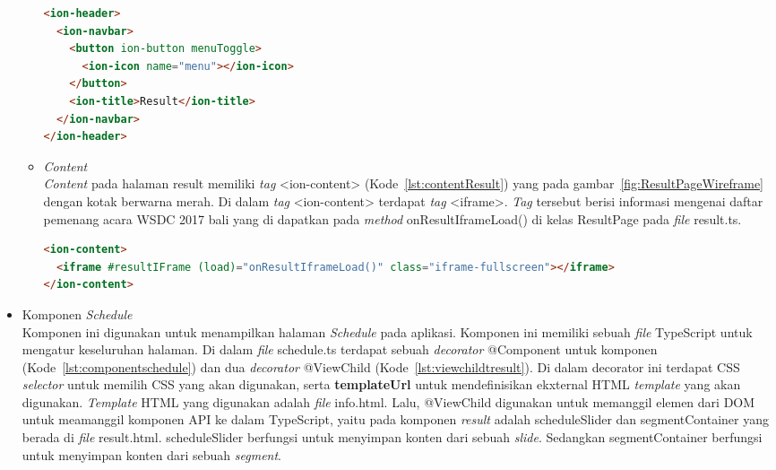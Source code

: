 \begin{itemize}
\begin{itemize}
\begin{lstlisting}[language=html, label={lst:headerResult}, caption=\textit{Header} pada result.html]
<ion-header>
  <ion-navbar>
    <button ion-button menuToggle>
      <ion-icon name="menu"></ion-icon>
    </button>
    <ion-title>Result</ion-title>
  </ion-navbar>
</ion-header>
\end{lstlisting}

		\item \textit{Content}\\
		\textit{Content} pada halaman result memiliki \textit{tag} <ion-content> (Kode~\ref{lst:contentResult}) yang pada gambar~\ref{fig:ResultPageWireframe} dengan kotak berwarna merah. Di dalam \textit{tag} <ion-content> terdapat \textit{tag} <iframe>. \textit{Tag} tersebut berisi informasi mengenai daftar pemenang acara WSDC 2017 bali yang di dapatkan pada \textit{method} onResultIframeLoad() di kelas ResultPage pada \textit{file} result.ts.
		
\begin{lstlisting}[language=html, label={lst:contentResult}, caption=\textit{Content} pada result.html]
<ion-content>
  <iframe #resultIFrame (load)="onResultIframeLoad()" class="iframe-fullscreen"></iframe>
</ion-content>
\end{lstlisting} 
	\end{itemize}
	
	\item Komponen \textit{Schedule}\\ 
	Komponen ini digunakan untuk menampilkan halaman \textit{Schedule} pada aplikasi. Komponen ini memiliki sebuah \textit{file} TypeScript untuk mengatur keseluruhan halaman. Di dalam \textit{file} schedule.ts terdapat sebuah \textit{decorator} @Component untuk komponen (Kode~\ref{lst:componentschedule}) dan dua \textit{decorator} @ViewChild (Kode~\ref{lst:viewchildtresult}). Di dalam decorator ini terdapat CSS \textit{selector} untuk memilih CSS yang akan digunakan, serta \textbf{templateUrl} untuk mendefinisikan ekxternal HTML \textit{template} yang akan digunakan. \textit{Template} HTML yang digunakan adalah \textit{file} info.html. Lalu, @ViewChild digunakan untuk memanggil elemen dari DOM untuk meamanggil komponen API ke dalam TypeScript, yaitu pada komponen \textit{result} adalah scheduleSlider dan segmentContainer yang berada di \textit{file} result.html. scheduleSlider berfungsi untuk menyimpan konten dari sebuah \textit{slide}. Sedangkan segmentContainer berfungsi untuk menyimpan konten dari sebuah \textit{segment}.
	

\end{itemize}
